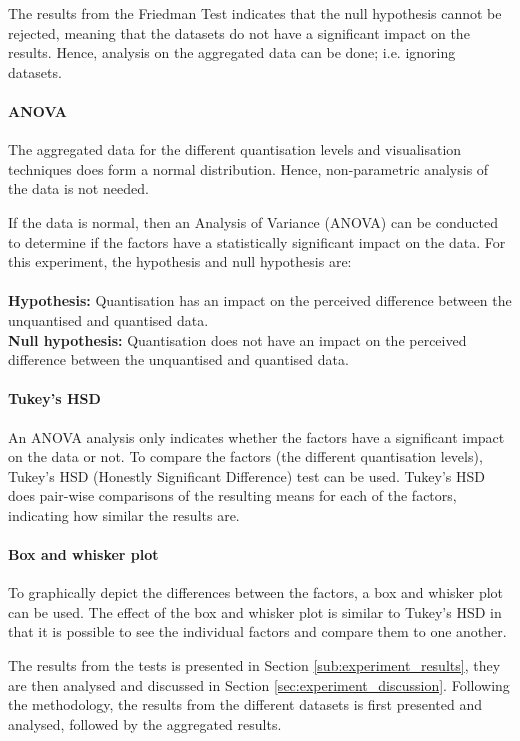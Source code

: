 The results from the Friedman Test indicates that the null hypothesis cannot be
rejected, meaning that the datasets do not have a significant impact on the
results. Hence, analysis on the aggregated data can be done; i.e. ignoring
datasets.

\paragraph{ANOVA}
The aggregated data for the different quantisation levels and visualisation
techniques does form a normal distribution. Hence, non-parametric analysis of
the data is not needed.

If the data is normal, then an Analysis of Variance (ANOVA) can be conducted to
determine if the factors have a statistically significant impact on the data.
For this experiment, the hypothesis and null hypothesis are: \\ \\
\textbf{Hypothesis:} Quantisation has an impact on the perceived difference
between the unquantised and quantised data. \\
\textbf{Null hypothesis:} Quantisation does not have an impact on the perceived
difference between the unquantised and quantised data.

\paragraph{Tukey's HSD}
An ANOVA analysis only indicates whether the factors have a significant impact
on the data or not. To compare the factors (the different quantisation levels),
Tukey's HSD (Honestly Significant Difference) test can be used. Tukey's HSD
does pair-wise comparisons of the resulting means for each of the factors,
indicating how similar the results are.

\paragraph{Box and whisker plot}
To graphically depict the differences between the factors, a box and whisker
plot can be used. The effect of the box and whisker plot is similar to Tukey's
HSD in that it is possible to see the individual factors and compare them to
one another.

The results from the tests is presented in Section
\ref{sub:experiment_results}, they are then analysed and discussed in Section
\ref{sec:experiment_discussion}. Following the methodology, the results from
the different datasets is first presented and analysed, followed by the
aggregated results.

